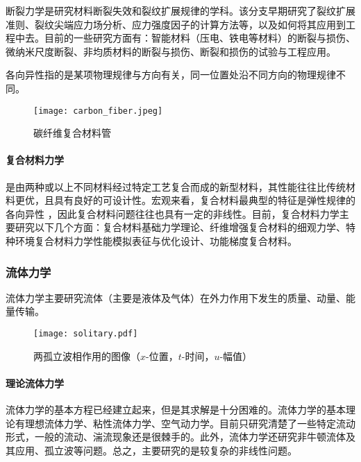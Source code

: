 断裂力学是研究材料断裂失效和裂纹扩展规律的学科。该分支早期研究了裂纹扩展准则、裂纹尖端应力场分析、应力强度因子的计算方法等，以及如何将其应用到工程中去。目前的一些研究方面有：智能材料（压电、铁电等材料）的断裂与损伤、微纳米尺度断裂、非均质材料的断裂与损伤、断裂和损伤的试验与工程应用。

\begin{marginpartext}
        各向异性指的是某项物理规律与方向有关，同一位置处沿不同方向的物理规律不同。
\end{marginpartext}


\begin{wrapfigure}[8]{l}{5cm}
    \texttt{[image: carbon\_fiber.jpeg]}
    \caption{碳纤维复合材料管}
\end{wrapfigure}

\paragraph{复合材料力学} 是由两种或以上不同材料经过特定工艺复合而成的新型材料，其性能往往比传统材料更优，且具有良好的可设计性。宏观来看，复合材料最典型的特征是弹性规律的各向异性		，因此复合材料问题往往也具有一定的非线性。目前，复合材料力学主要研究以下几个方面：复合材料基础力学理论、纤维增强复合材料的细观力学、特种环境复合材料力学性能模拟表征与优化设计、功能梯度复合材料。



\subsubsection{流体力学}

流体力学主要研究流体（主要是液体及气体）在外力作用下发生的质量、动量、能量传输。

\begin{figure}
    \centering
    \texttt{[image: solitary.pdf]}
    \caption{两孤立波相作用的图像（$x$-位置，$t$-时间，$u$-幅值）}
\end{figure}

\paragraph{理论流体力学}

流体力学的基本方程已经建立起来，但是其求解是十分困难的。流体力学的基本理论有理想流体力学、粘性流体力学、空气动力学。目前只研究清楚了一些特定流动形式，一般的流动、湍流现象还是很棘手的。此外，流体力学还研究非牛顿流体及其应用、孤立波等问题。总之，主要研究的是较复杂的非线性问题。

